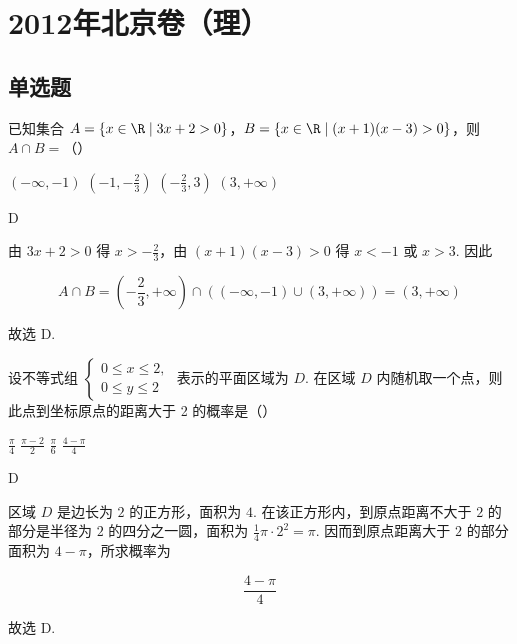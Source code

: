 \chapter{2012年北京卷（理）}


\section{单选题}

\begin{problem}
已知集合 \(A = \{x \in \R \mid 3x + 2 > 0\}\)，\(B = \{x \in \R \mid (x + 1)(x - 3) > 0\}\)，则 \(A \cap B =\)（\quad）

\choices
    {\((-\infty, -1)\)}
    {\(\left(-1, -\frac{2}{3}\right)\)}
    {\(\left(-\frac{2}{3}, 3\right)\)}
    {\((3, +\infty)\)}
\end{problem}

\begin{answer}
D
\end{answer}

\begin{solution}
由 \(3x+2>0\) 得 \(x>-\frac{2}{3}\)，由 \((x+1)(x-3)>0\) 得 \(x<-1\) 或 \(x>3\). 因此

\[
A\cap B=\left(-\frac{2}{3},+\infty\right)\cap\left(\left(-\infty,-1\right)\cup(3,+\infty)\right)=(3,+\infty)
\]

故选 D.
\end{solution}

\begin{problem}
设不等式组 \(\begin{cases}
0 \leqslant x \leqslant 2,\\
0 \leqslant y \leqslant 2
\end{cases}\) 表示的平面区域为 \(D\). 在区域 \(D\) 内随机取一个点，则此点到坐标原点的距离大于 2 的概率是（\quad）

\choices
    {\(\frac{\pi}{4}\)}
    {\(\frac{\pi - 2}{2}\)}
    {\(\frac{\pi}{6}\)}
    {\(\frac{4 - \pi}{4}\)}
\end{problem}

\begin{answer}
D
\end{answer}

\begin{solution}
区域 \(D\) 是边长为 \(2\) 的正方形，面积为 \(4\). 在该正方形内，到原点距离不大于 \(2\) 的部分是半径为 \(2\) 的四分之一圆，面积为 \(\frac14\pi\cdot2^2=\pi\). 因而到原点距离大于 \(2\) 的部分面积为 \(4-\pi\)，所求概率为

\[
\frac{4-\pi}{4}
\]

故选 D.
\end{solution}

